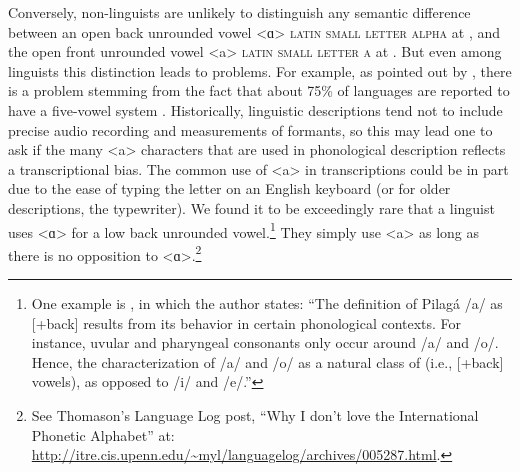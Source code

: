 Conversely,
non-linguists are unlikely to distinguish any semantic difference between an
open back unrounded vowel <ɑ> \textsc{latin small letter alpha} at
, and the open front unrounded vowel <a> \textsc{latin small letter
a} at . But even among linguists this distinction leads to problems.
For example, as pointed out by \citet{Mielke2009}, there is a problem stemming
from the fact that about 75\% of languages are reported to have a five-vowel
system \citep{Maddieson1984}. Historically, linguistic descriptions tend not to
include precise audio recording and measurements of formants, so this may lead
one to ask if the many <a> characters that are used in phonological description
reflects a transcriptional bias. The common use of <a> in transcriptions
could be in part due to the ease of typing the letter on an English keyboard (or
for older descriptions, the typewriter). We found it to be exceedingly rare that
a linguist uses <ɑ> for a low back unrounded vowel.\footnote{One example is
\citet[75]{Vidal2001a}, in which the author states: ``The definition of Pilagá
/a/ as [+back] results from its behavior in certain phonological contexts.
For instance, uvular and pharyngeal consonants only occur around /a/ and /o/.
Hence, the characterization of /a/ and /o/ as a natural class of (i.e.,
[+back] vowels), as opposed to /i/ and /e/.''} They simply use <a> as
long as there is no opposition to <ɑ>.\footnote{See Thomason's Language Log
post, ``Why I don't love the International Phonetic Alphabet'' at:
\url{http://itre.cis.upenn.edu/~myl/languagelog/archives/005287.html}.}

